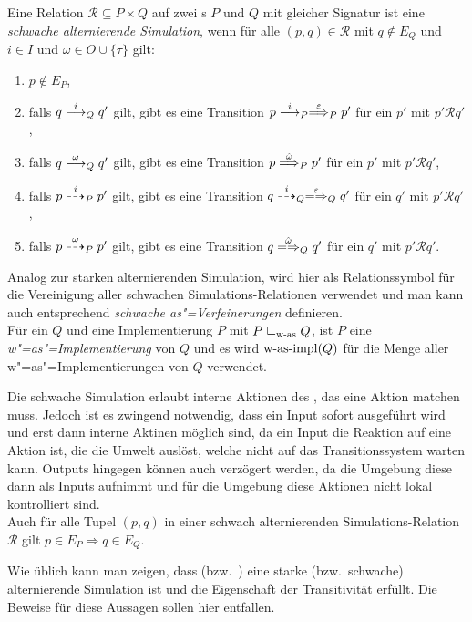 \begin{Def}
  \label{wSimDef}
  Eine Relation $\mathcal{R} \subseteq P  \times Q$ auf zwei \MEIO{}s $P$ und
  $Q$ mit gleicher Signatur ist eine \emph{schwache alternierende Simulation},
  wenn für alle $(p,q) \in \mathcal{R}$ mit $q\notin E_Q$ und $i\in I$ und
  $\omega\in O\cup\{\tau\}$ gilt:
  \begin{enumerate}
    \item $p\notin E_P$,
    \item falls $q\must[i]_Q q'$ gilt, gibt es eine Transition $p \must[i]_P
      \weakmust[\varepsilon]_P p'$ für ein $p'$ mit $p'\mathcal{R}q'$,
    \item falls $q\must[\omega]_Q q'$ gilt, gibt es eine Transition $p
      \weakmust[\hat{\omega}]_P p'$ für ein $p'$ mit $p'\mathcal{R}q'$,
    \item falls $p\may[i]_P p'$ gilt, gibt es eine Transition $q
      \may[i]_Q\weakmay[\varepsilon]_Q q'$ für ein $q'$ mit $p'\mathcal{R}q'$,
    \item falls $p\may[\omega]_P p'$ gilt, gibt es eine Transition $q
      \weakmay[\hat{\omega}]_Q q'$ für ein $q'$ mit $p'\mathcal{R}q'$.
  \end{enumerate}
  Analog zur starken alternierenden Simulation, wird hier \wasRel{} als
  Relationssymbol für die Vereinigung aller schwachen Simulations-Relationen
  verwendet und man kann auch entsprechend \emph{schwache as"=Verfeinerungen}
  definieren.\\
  Für ein \MEIO{} $Q$ und eine Implementierung $P$ mit $P\sqsubseteq _{\mathrm{w}\text{-}\mathrm{as}} Q$, ist $P$
  eine \emph{w"=as"=Implementierung} von $Q$ und es wird $\mathrm{w}\text{-}\mathrm{as}\text{-}\mathrm{impl} (Q)$ für die
  Menge aller w"=as"=Implementierungen von $Q$ verwendet.
\end{Def}

Die schwache Simulation erlaubt interne Aktionen des \MEIO{}, das eine Aktion
matchen muss. Jedoch ist es zwingend notwendig, dass ein Input sofort
ausgeführt wird und erst dann interne Aktinen möglich sind, da ein Input die
Reaktion auf eine Aktion ist, die die Umwelt auslöst, welche nicht auf das
Transitionssystem warten kann. Outputs hingegen können auch verzögert werden,
da die Umgebung diese dann als Inputs aufnimmt und für die Umgebung diese
Aktionen nicht lokal kontrolliert sind.\\
Auch für alle Tupel $(p,q)$ in einer schwach alternierenden
Simulations-Relation $\mathcal{R}$ gilt $p\in E_P\Rightarrow q\in E_Q$.

Wie üblich kann man zeigen, dass \asRel{} (bzw.\ \wasRel{}) eine starke (bzw.\
schwache) alternierende Simulation ist und die Eigenschaft der Transitivität
erfüllt. Die Beweise für diese Aussagen sollen hier entfallen.

